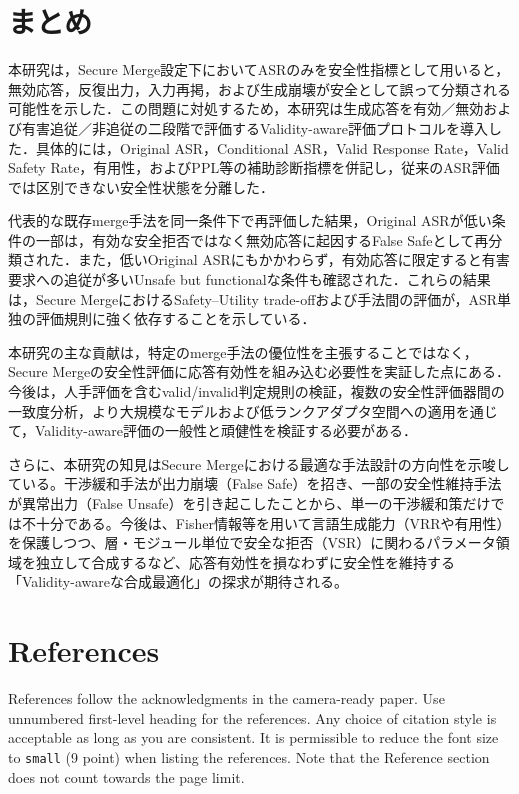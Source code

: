 \documentclass{article}
\begin{document}
\section{まとめ}

本研究は，Secure Merge設定下においてASRのみを安全性指標として用いると，無効応答，反復出力，入力再掲，および生成崩壊が安全として誤って分類される可能性を示した．この問題に対処するため，本研究は生成応答を有効／無効および有害追従／非追従の二段階で評価するValidity-aware評価プロトコルを導入した．具体的には，Original ASR，Conditional ASR，Valid Response Rate，Valid Safety Rate，有用性，およびPPL等の補助診断指標を併記し，従来のASR評価では区別できない安全性状態を分離した．

代表的な既存merge手法を同一条件下で再評価した結果，Original ASRが低い条件の一部は，有効な安全拒否ではなく無効応答に起因するFalse Safeとして再分類された．また，低いOriginal ASRにもかかわらず，有効応答に限定すると有害要求への追従が多いUnsafe but functionalな条件も確認された．これらの結果は，Secure MergeにおけるSafety--Utility trade-offおよび手法間の評価が，ASR単独の評価規則に強く依存することを示している．

本研究の主な貢献は，特定のmerge手法の優位性を主張することではなく，Secure Mergeの安全性評価に応答有効性を組み込む必要性を実証した点にある．今後は，人手評価を含むvalid/invalid判定規則の検証，複数の安全性評価器間の一致度分析，より大規模なモデルおよび低ランクアダプタ空間への適用を通じて，Validity-aware評価の一般性と頑健性を検証する必要がある．

さらに、本研究の知見はSecure Mergeにおける最適な手法設計の方向性を示唆している。干渉緩和手法が出力崩壊（False Safe）を招き、一部の安全性維持手法が異常出力（False Unsafe）を引き起こしたことから、単一の干渉緩和策だけでは不十分である。今後は、Fisher情報等を用いて言語生成能力（VRRや有用性）を保護しつつ、層・モジュール単位で安全な拒否（VSR）に関わるパラメータ領域を独立して合成するなど、応答有効性を損なわずに安全性を維持する「Validity-awareな合成最適化」の探求が期待される。


\section*{References}


References follow the acknowledgments in the camera-ready paper. Use unnumbered first-level heading for
the references. Any choice of citation style is acceptable as long as you are
consistent. It is permissible to reduce the font size to \verb+small+ (9 point)
when listing the references.
Note that the Reference section does not count towards the page limit.
\medskip
\end{document}
